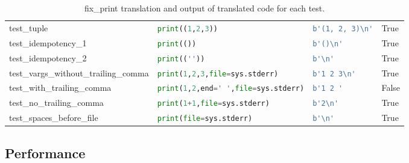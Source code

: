 \begin{table*}[ht]
\begin{tabular}{@{}l|lll@{}}
    test\_tuple                           & \lstinline[language=Python, style=pythonstyle]|print((1,2,3))                    | & \lstinline[language=Python, style=pythonstyle]|b'(1, 2, 3)\n'| & True                      \\
    test\_idempotency\_1                  & \lstinline[language=Python, style=pythonstyle]|print(())                         | & \lstinline[language=Python, style=pythonstyle]|b'()\n'       | & True                      \\
    test\_idempotency\_2                  & \lstinline[language=Python, style=pythonstyle]|print((''))                       | & \lstinline[language=Python, style=pythonstyle]|b'\n'         | & True                      \\
    test\_vargs\_without\_trailing\_comma & \lstinline[language=Python, style=pythonstyle]|print(1,2,3,file=sys.stderr)      | & \lstinline[language=Python, style=pythonstyle]|b'1 2 3\n'    | & True                      \\
    test\_with\_trailing\_comma           & \lstinline[language=Python, style=pythonstyle]|print(1,2,end=' ',file=sys.stderr)| & \lstinline[language=Python, style=pythonstyle]|b'1 2 '       |                & False                     \\
    test\_no\_trailing\_comma             & \lstinline[language=Python, style=pythonstyle]|print(1+1,file=sys.stderr)        | & \lstinline[language=Python, style=pythonstyle]|b'2\n'        | & True                      \\
    test\_spaces\_before\_file            & \lstinline[language=Python, style=pythonstyle]|print(file=sys.stderr)            | & \lstinline[language=Python, style=pythonstyle]|b'\n'         | & True                      \\ \bottomrule
    \end{tabular}
    \caption{fix\_print translation and output of translated code for each test.}
    \label{tab:fix_print-accuracy}
\end{table*}

\subsection{Performance}


